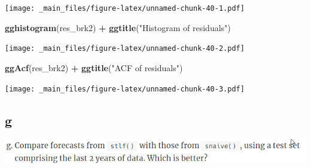 \documentclass[]{book}
\newenvironment{Shaded}{\begin{snugshade}}{\end{snugshade}}
\newcommand{\KeywordTok}[1]{\textcolor[rgb]{0.13,0.29,0.53}{\textbf{#1}}}
\newcommand{\NormalTok}[1]{#1}
\newcommand{\OperatorTok}[1]{\textcolor[rgb]{0.81,0.36,0.00}{\textbf{#1}}}
\newcommand{\StringTok}[1]{\textcolor[rgb]{0.31,0.60,0.02}{#1}}
\begin{document}
\texttt{[image: \_main\_files/figure-latex/unnamed-chunk-40-1.pdf]}

\begin{Shaded}
\begin{Highlighting}[]
\KeywordTok{gghistogram}\NormalTok{(res_brk2) }\OperatorTok{+}\StringTok{ }\KeywordTok{ggtitle}\NormalTok{(}\StringTok{"Histogram of residuals"}\NormalTok{)}
\end{Highlighting}
\end{Shaded}

\texttt{[image: \_main\_files/figure-latex/unnamed-chunk-40-2.pdf]}

\begin{Shaded}
\begin{Highlighting}[]
\KeywordTok{ggAcf}\NormalTok{(res_brk2) }\OperatorTok{+}\StringTok{ }\KeywordTok{ggtitle}\NormalTok{(}\StringTok{"ACF of residuals"}\NormalTok{)}
\end{Highlighting}
\end{Shaded}

\texttt{[image: \_main\_files/figure-latex/unnamed-chunk-40-3.pdf]}

\hypertarget{g}{%
\subsection{g}\label{g}}

\includegraphics{./week2/6.6g.png}
\end{document}
